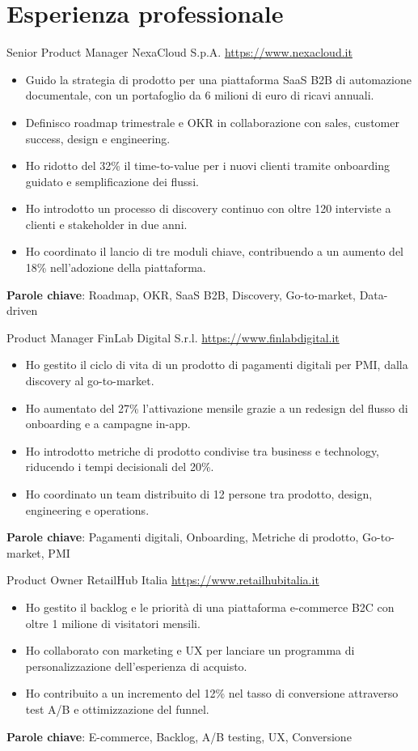\documentclass[a4paper, serif, 10pt]{moderncv}
\begin{document}
\section{Esperienza professionale}

        {Senior Product Manager}
        {NexaCloud S.p.A.}
        {\url{https://www.nexacloud.it}}
        {}
        {\begin{itemize}
\item Guido la strategia di prodotto per una piattaforma SaaS B2B di automazione documentale, con un portafoglio da 6 milioni di euro di ricavi annuali.
\item Definisco roadmap trimestrale e OKR in collaborazione con sales, customer success, design e engineering.
\item Ho ridotto del 32\% il time-to-value per i nuovi clienti tramite onboarding guidato e semplificazione dei flussi.
\item Ho introdotto un processo di discovery continuo con oltre 120 interviste a clienti e stakeholder in due anni.
\item Ho coordinato il lancio di tre moduli chiave, contribuendo a un aumento del 18\% nell'adozione della piattaforma.
\end{itemize}
\textbf{Parole chiave}: Roadmap, OKR, SaaS B2B, Discovery, Go-to-market, Data-driven}

        {Product Manager}
        {FinLab Digital S.r.l.}
        {\url{https://www.finlabdigital.it}}
        {}
        {\begin{itemize}
\item Ho gestito il ciclo di vita di un prodotto di pagamenti digitali per PMI, dalla discovery al go-to-market.
\item Ho aumentato del 27\% l'attivazione mensile grazie a un redesign del flusso di onboarding e a campagne in-app.
\item Ho introdotto metriche di prodotto condivise tra business e technology, riducendo i tempi decisionali del 20\%.
\item Ho coordinato un team distribuito di 12 persone tra prodotto, design, engineering e operations.
\end{itemize}
\textbf{Parole chiave}: Pagamenti digitali, Onboarding, Metriche di prodotto, Go-to-market, PMI}

        {Product Owner}
        {RetailHub Italia}
        {\url{https://www.retailhubitalia.it}}
        {}
        {\begin{itemize}
\item Ho gestito il backlog e le priorità di una piattaforma e-commerce B2C con oltre 1 milione di visitatori mensili.
\item Ho collaborato con marketing e UX per lanciare un programma di personalizzazione dell'esperienza di acquisto.
\item Ho contribuito a un incremento del 12\% nel tasso di conversione attraverso test A/B e ottimizzazione del funnel.
\end{itemize}
\textbf{Parole chiave}: E-commerce, Backlog, A/B testing, UX, Conversione}
\end{document}
